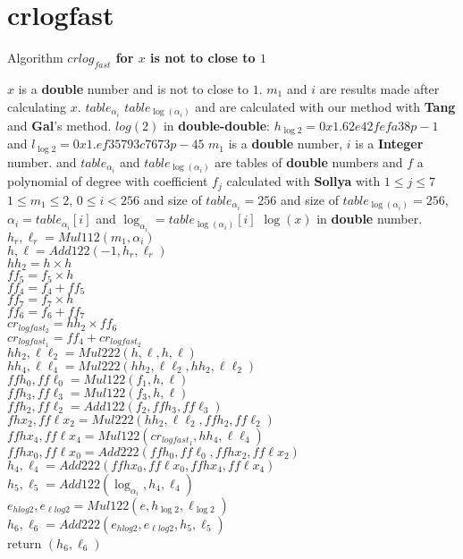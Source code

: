 \section*{crlogfast}
\begin{algorithm}[htbp]
  \caption{Algorithm \textbf{$crlog_{fast}$ for $x$ is not to close to $1$ }}
\begin{algorithmic}[1]
\Condition $x$ is a \textbf{double} number and is not to close to $1$.
\Condition $m_1$ and $i$ are results made after calculating $x$.
\Condition $table_{\alpha_{i}}$  $table_{\log(\alpha_{i})}$ and are calculated with our method with \textbf{Tang} and \textbf{Gal}'s method.
\Condition $log(2)$ in \textbf{double-double}: $h_{\log2} = 0x1.62e42fefa38p-1$ and $l_{\log2} = 0x1.ef35793c7673p-45$ 
\Input $m_1$ is a \textbf{double} number, $i$ is a \textbf{Integer} number.
and $table_{\alpha_{i}}$ and $table_{\log(\alpha_{i})}$ are  tables of \textbf{double} numbers and $f$ a polynomial of degree with coefficient $f_j$ calculated with \textbf{Sollya}
with $1\le j \le 7$
\Condition $1 \le m_1 \le 2 $, $0 \le i < 256$ and size of $table_{\alpha_{i}} = 256$
and size of $table_{\log (\alpha_{i})} = 256$, $\alpha_i = table_{\alpha_{i}}[i]$ and $\log_{\alpha_i} = table_{\log (\alpha_{i})}[i]$
\Output $\log(x)$ in \textbf{double} number.
\State $h_r,\ell_r = Mul112(m_1, \alpha_i )$\\
$h,\ell = Add122(-1,h_r,\ell_r)$\\
$hh_2 = h \times h$\\
$ff_5 = f_5 \times h$\\
$ff_4 = f_4 + ff_5$\\
$ff_7 = f_7 \times h$\\
$ff_6 = f_6 + ff_7$\\
$cr_{logfast_2} = hh_2  \times ff_6$\\
$cr_{logfast_1} = ff_4  + cr_{logfast_2}$\\
$hh_2,\ell\ell_2 = Mul222(h,\ell,h,\ell)$\\
$hh_4,\ell\ell_4 = Mul222(hh_2,\ell\ell_2,hh_2,\ell\ell_2)$\\
$ffh_0,ff\ell_0 = Mul122(f_1,h,\ell)$\\
$ffh_3,ff\ell_3 = Mul122(f_3,h,\ell)$\\
$ffh_2,ff\ell_2 = Add122(f_2,ffh_3,ff\ell_3)$\\
$fhx_2,ff\ell x_2 = Mul222(hh_2,\ell\ell_2,ffh_2,ff\ell_2)$\\
$ffhx_4,ff\ell x_4 = Mul122(cr_{logfast_1},hh_4,\ell\ell_4)$\\
$ffhx_0,ff\ell x_0 = Add222(ffh_0, ff\ell_0, ffhx_2, ff\ell x_2)$\\
$h_4,\ell_4 = Add222(ffhx_0,ff\ell x_0, ffhx_4,ff\ell x_4)$\\
$h_5,\ell_5 = Add122(\log_{\alpha_i}, h_4, \ell_4)$\\
$e_{hlog2},e_{\ell log2} = Mul122(e, h_{\log2}, \ell_{\log2})$\\
$h_6, \ell_6 = Add222(e_{hlog2}, e_{\ell log2},h_5,\ell_5)$\\
return  $(h_6, \ell_6)$
\end{algorithmic}
\label{algo:crlogfast}
\end{algorithm}

